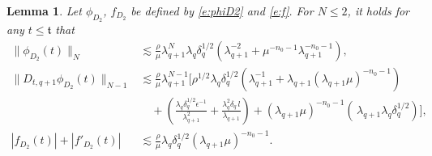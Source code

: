 \documentclass[10pt,a4paper]{amsart}
\numberwithin{equation}{section}
\numberwithin{corollario}{section}
\newtheorem{lemma}{Lemma}
\numberwithin{lemma}{section}
\numberwithin{prop}{section}
\theoremstyle{definition}
\theoremstyle{remark}
\newcommand{\qq}{_{q+1}}
\begin{document}
\begin{lemma}\label{lemma:phiD2}
Let $\phi_{D_2}$, $f_{D_2}$ be defined by \eqref{e:phiD2} and \eqref{e:f}. For $N\le 2$, it holds for any $t\le \mathfrak{t}$ that
    \begin{align}
    \label{est:phiD2}
    \|\phi_{D_2}(t)\|_N
    &\lesssim 
    \frac{\rho}{\mu}\lambda\qq^N\lambda_q\delta_q^{1/2}(\lambda\qq^{-2}+\mu^{-n_0-1}\lambda\qq^{-n_0-1}),
    \\
    \label{e:DtphiD2}
    \|D_{t,q+1}\phi_{D_2}(t)\|_{N-1}
    &\lesssim 
    \frac{\rho}{\mu} \lambda\qq^{N-1}  \Bigg[\rho^{1/2}\lambda_q\delta_q^{1/2}(\lambda\qq^{-1}+\lambda\qq(\lambda\qq\mu)^{-n_0-1})\\
    &\quad+
    \left(\frac{\lambda_q\delta_q^{1/2}\epsilon^{-1}}{\lambda\qq^2}+\frac{\lambda_q^2\delta_q\,l}{\lambda\qq}\right)
    + 
    (\lambda\qq\mu)^{-n_0-1} \left(\,\lambda\qq\lambda_q\delta_q^{1/2}\right)\Bigg],
    \\
    \label{f_D2}|f_{D_2}(t)|+|f'_{D_2}(t)|
    &\lesssim 
    \frac{\rho}{\mu}\lambda_q\delta_q^{1/2}(\lambda\qq\mu)^{-n_0-1}.
    \end{align}   
\end{lemma}
\end{document}
